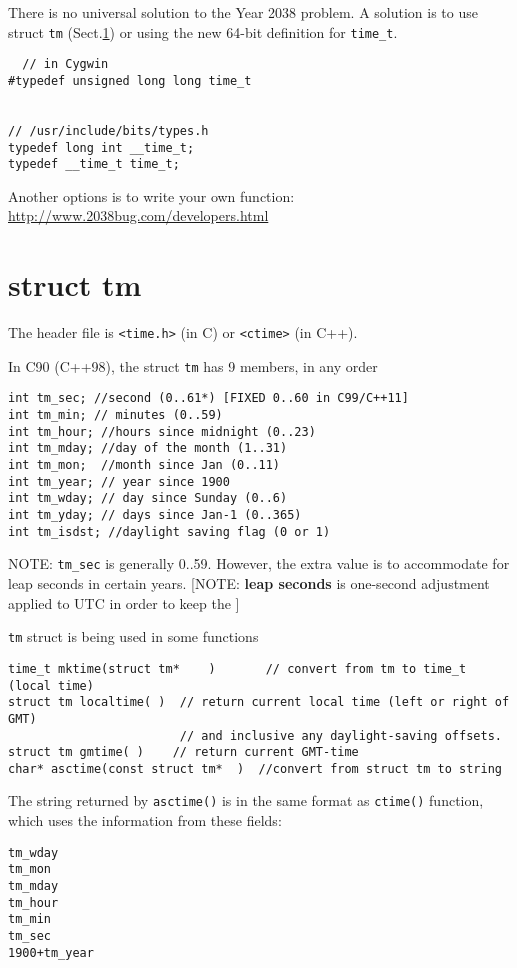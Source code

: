 There is no universal solution to the Year 2038 problem. A solution is to use
struct \verb!tm! (Sect.\ref{sec:struct_tm}) or using the new 64-bit definition
for \verb!time_t!.
\begin{verbatim}
  // in Cygwin
#typedef unsigned long long time_t


// /usr/include/bits/types.h
typedef long int __time_t;
typedef __time_t time_t;
\end{verbatim}


Another options is to write your own function:
\url{http://www.2038bug.com/developers.html}


\section{struct tm}
\label{sec:struct_tm}

The header file is \verb!<time.h>! (in C) or \verb!<ctime>! (in C++).

In C90 (C++98), the struct \verb!tm! has 9 members, in any order
\begin{verbatim}
int tm_sec; //second (0..61*) [FIXED 0..60 in C99/C++11]
int tm_min; // minutes (0..59)
int tm_hour; //hours since midnight (0..23)
int tm_mday; //day of the month (1..31)
int tm_mon;  //month since Jan (0..11)
int tm_year; // year since 1900
int tm_wday; // day since Sunday (0..6)
int tm_yday; // days since Jan-1 (0..365)
int tm_isdst; //daylight saving flag (0 or 1)
\end{verbatim}
NOTE: \verb!tm_sec! is generally 0..59. However, the extra value is to
accommodate for leap seconds in certain years. [NOTE: {\bf leap seconds} is
one-second adjustment applied to UTC in order to keep the ]

\verb!tm! struct is being used in some functions
\begin{verbatim}
time_t mktime(struct tm*	)		// convert from tm to time_t (local time)
struct tm localtime( )  // return current local time (left or right of GMT)
                        // and inclusive any daylight-saving offsets.
struct tm gmtime( )    // return current GMT-time
char* asctime(const struct tm*	)  //convert from struct tm to string 
\end{verbatim}
The string returned by \verb!asctime()! is in the same format as \verb!ctime()!
function, which uses the information from these fields: 
\begin{verbatim}
tm_wday
tm_mon
tm_mday
tm_hour
tm_min
tm_sec
1900+tm_year
\end{verbatim}

